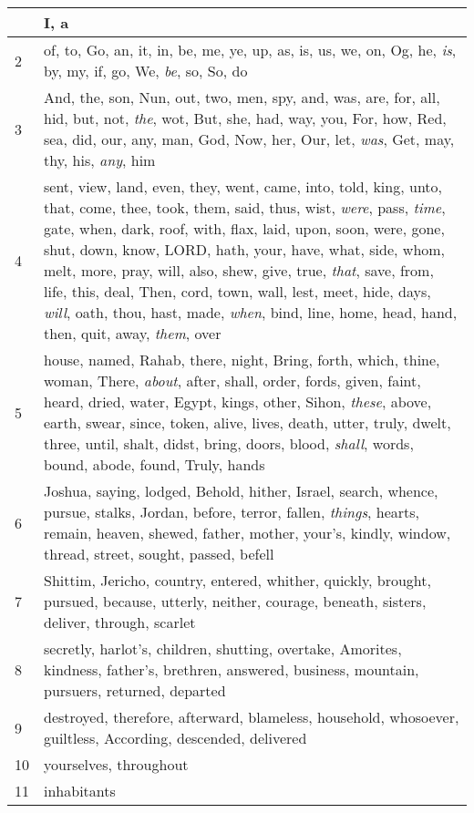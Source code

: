 \begin{longtable}{l|p{3.75in}}
\hline \hline
\endlastfoot
1 & I, a \\ \hline
2 & of, to, Go, an, it, in, be, me, ye, up, as, is, us, we, on, Og, he, \emph{is}, by, my, if, go, We, \emph{be}, so, So, do \\ \hline
3 & And, the, son, Nun, out, two, men, spy, and, was, are, for, all, hid, but, not, \emph{the}, wot, But, she, had, way, you, For, how, Red, sea, did, our, any, man, God, Now, her, Our, let, \emph{was}, Get, may, thy, his, \emph{any}, him \\ \hline
4 & sent, view, land, even, they, went, came, into, told, king, unto, that, come, thee, took, them, said, thus, wist, \emph{were}, pass, \emph{time}, gate, when, dark, roof, with, flax, laid, upon, soon, were, gone, shut, down, know, LORD, hath, your, have, what, side, whom, melt, more, pray, will, also, shew, give, true, \emph{that}, save, from, life, this, deal, Then, cord, town, wall, lest, meet, hide, days, \emph{will}, oath, thou, hast, made, \emph{when}, bind, line, home, head, hand, then, quit, away, \emph{them}, over \\ \hline
5 & house, named, Rahab, there, night, Bring, forth, which, thine, woman, There, \emph{about}, after, shall, order, fords, given, faint, heard, dried, water, Egypt, kings, other, Sihon, \emph{these}, above, earth, swear, since, token, alive, lives, death, utter, truly, dwelt, three, until, shalt, didst, bring, doors, blood, \emph{shall}, words, bound, abode, found, Truly, hands \\ \hline
6 & Joshua, saying, lodged, Behold, hither, Israel, search, whence, pursue, stalks, Jordan, before, terror, fallen, \emph{things}, hearts, remain, heaven, shewed, father, mother, your's, kindly, window, thread, street, sought, passed, befell \\ \hline
7 & Shittim, Jericho, country, entered, whither, quickly, brought, pursued, because, utterly, neither, courage, beneath, sisters, deliver, through, scarlet \\ \hline
8 & secretly, harlot's, children, shutting, overtake, Amorites, kindness, father's, brethren, answered, business, mountain, pursuers, returned, departed \\ \hline
9 & destroyed, therefore, afterward, blameless, household, whosoever, guiltless, According, descended, delivered \\ \hline
10 & yourselves, throughout \\ \hline
11 & inhabitants \\ \hline
\end{longtable}






